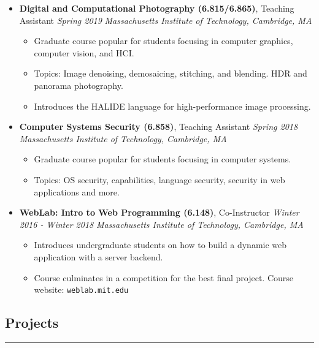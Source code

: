 \documentclass[10pt]{article}
\begin{document}
\begin{itemize}
    \item
        \textbf{Digital and Computational Photography (6.815/6.865)}, Teaching Assistant \hfill \emph{Spring 2019} \linebreak
        \emph{Massachusetts Institute of Technology, Cambridge, MA}
        \begin{itemize}
            \item Graduate course popular for students focusing in computer graphics, computer vision, and HCI.
            \item Topics: Image denoising, demosaicing, stitching, and blending. HDR and panorama photography.
            \item Introduces the HALIDE language for high-performance image processing.
        \end{itemize}
    \item
        \textbf{Computer Systems Security (6.858)}, Teaching Assistant \hfill \emph{Spring 2018} \linebreak
        \emph{Massachusetts Institute of Technology, Cambridge, MA}
        \begin{itemize}
            \item Graduate course popular for students focusing in computer systems.
            \item Topics: OS security, capabilities, language security, security in web applications and more.
        \end{itemize}
    \item
        \textbf{WebLab: Intro to Web Programming (6.148)}, Co-Instructor \hfill \emph{Winter 2016 - Winter 2018} \linebreak
        \emph{Massachusetts Institute of Technology, Cambridge, MA}
        \begin{itemize}
            \item Introduces undergraduate students on how to build a dynamic web application with a server backend.
            \item Course culminates in a competition for the best final project. Course website: \texttt{weblab.mit.edu}
        \end{itemize}
\end{itemize}

\subsection*{Projects}
\vspace*{-\baselineskip}
\noindent\rule{\linewidth}{0.4pt}
\end{document}
